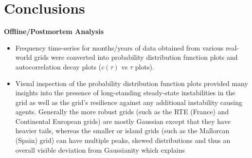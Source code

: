 \section[Conclusions]{Conclusions}
\label{sec:concl}

\noindent\textbf{Offline/Postmortem Analysis}
\begin{itemize}
	\item Frequency time-series for months/years of data obtained from various real-world grids were converted into probability distribution function plots and autocorrelation decay plots ($c(\tau)$ vs $\tau$ plots).
	\item Visual inspection of the probability distribution function plots provided many insights into the presence of long-standing steady-state instabilities in the grid as well as the grid's resilience against any additional instability causing agents. Generally the more robust grids (such as the RTE (France) and Continental European grids) are mostly Gaussian except that they have heavier tails, whereas the smaller or island grids (such as the Mallorcan (Spain) grid) can have multiple peaks, skewed distributions and thus an overall visible deviation from Gaussianity which explains  
\end{itemize}